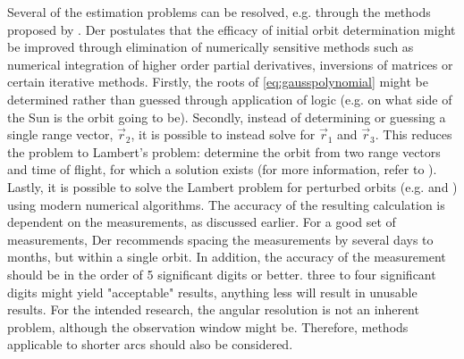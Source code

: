 Several of the estimation problems can be resolved, e.g. through the methods proposed by \cite{anglesonly}. Der postulates that the efficacy of initial orbit determination might be improved through elimination of numerically sensitive methods such as numerical integration of higher order partial derivatives, inversions of matrices or certain iterative methods. Firstly, the roots of \autoref{eq:gausspolynomial} might be determined rather than guessed through application of logic (e.g. on what side of the Sun is the orbit going to be). Secondly, instead of determining or guessing a single range vector, $\vec{r}_2$, it is possible to instead solve for $\vec{r}_1$ and $\vec{r}_3$. This reduces the problem to Lambert's problem: determine the orbit from two range vectors and time of flight, for which a solution exists (for more information, refer to \cite{curtis}). Lastly, it is possible to solve the Lambert problem for perturbed orbits (e.g. \cite{superlambert} and \cite{superlamberttwo}) using modern numerical algorithms. The accuracy of the resulting calculation is dependent on the measurements, as discussed earlier. For a good set of measurements, Der recommends spacing the measurements by several days to months, but within a single orbit. In addition, the accuracy of the measurement should be in the order of 5 significant digits or better. three to four significant digits might yield "acceptable" results, anything less will result in unusable results. For the intended research, the angular resolution is not an inherent problem, although the observation window might be. Therefore, methods applicable to shorter arcs should also be considered.

